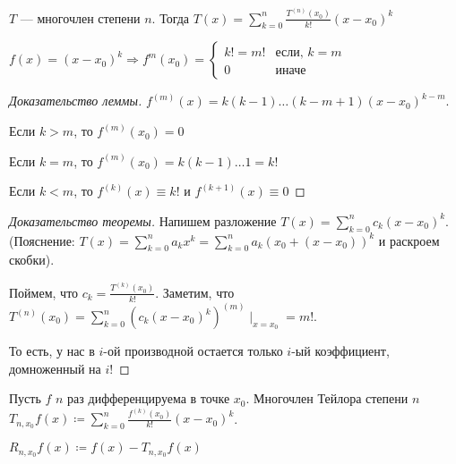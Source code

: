 \begin{theorem}
    $T$ --- многочлен степени  $n$. Тогда  $T(x) = \sum_{k=0}^n \frac{T^{(n)}(x_0)}{k!}(x - x_0)^k$
\end{theorem}
\begin{lemma}
    $f(x) = (x-x_0)^k \Rightarrow f^{m}(x_0) = \begin{cases} k! = m! & \text{если, }k=m \\ 0 & \text{иначе} \end{cases}$
\end{lemma}
\begin{proof}[Доказательство леммы]
    $f^{(m)}(x) = k(k-1)\ldots(k - m + 1)(x-x_0)^{k-m}$.

    Если $k > m$, то  $f^{(m)}(x_0) = 0$

    Если $k = m$, то  $f^{(m)}(x_0) = k(k-1)\ldots 1 = k!$

    Если $k < m$, то  $f^{(k)}(x) \equiv k!$ и  $f^{(k + 1)}(x) \equiv 0$
\end{proof}
\begin{proof}[Доказательство теоремы]
    Напишем разложение $T(x) = \sum_{k=0}^n c_k(x-x_0)^k$. (Пояснение: $T(x) = \sum_{k=0}^n a_k x^k = \sum_{k=0}^n a_k(x_0 + (x-x_0))^k$ и раскроем скобки).

    Поймем, что $c_k = \frac{T^{(k)}(x_0)}{k!}$. Заметим, что $T^{(n)}(x_0) = \sum_{k=0}^{n} (c_k(x-x_0)^k)^{(m)} \mid_{x=x_0} = m!$.

    То есть, у нас в $i$-ой производной остается только  $i$-ый коэффициент, домноженный на $i!$ 
\end{proof}
\begin{definition}
    Пусть $f$  $n$ раз дифференцируема в точке  $x_0$. Многочлен Тейлора степени $n$  $T_{n, x_0} f(x) \coloneqq \sum_{k=0}^n \frac{f^{(k)}(x_0)}{k!}(x-x_0)^k$.

    $R_{n, x_0}f(x) \coloneqq f(x) - T_{n, x_0}f(x)$
\end{definition}


